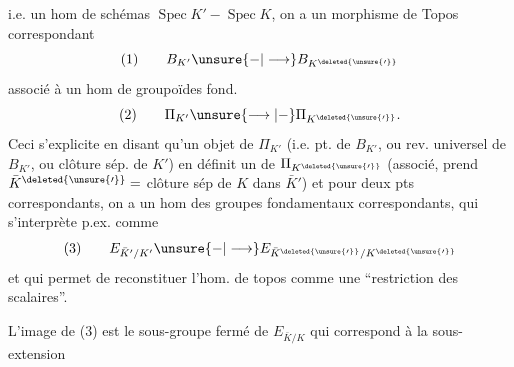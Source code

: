 i.e. un hom de schémas $\operatorname{Spec}K' - \operatorname{Spec}K$, on a un morphisme de Topos correspondant
\[
(1)\qquad B_{K'}\unsure{-|\longrightarrow}B_{K^{\deleted{\unsure{\prime}}}}
\]
associé à un hom de groupoïdes fond.
\[
(2)\qquad \Pi_{K'}\unsure{\longrightarrow|-}\Pi_{K^{\deleted{\unsure{\prime}}}}.
\]
Ceci s'explicite en disant qu'un  objet de $\Pi_{K'}$ (i.e. pt. de $B_{K'}$, ou rev. universel de $B_{K'}$, \deleted{)} ou clôture sép. de $K'$) en définit un de $\Pi_{K^{\deleted{\unsure{\prime}}}}$ (associé,  prend $\bar K^{\deleted{\unsure{\prime}}}=$ clôture  sép de $K$ dans $\bar K'$) et pour deux pts correspondants, on a un hom des groupes fondamentaux correspondants, qui s'interprète p.ex. comme
\[
(3)\qquad E_{\bar K'/K'}\unsure{-|\longrightarrow}E_{\bar K^{\deleted{\unsure{\prime}}}/K^{\deleted{\unsure{\prime}}}}
\]
et qui permet de reconstituer l'hom. de topos comme une ``restriction des scalaires''.

L'image de (3) est le sous-groupe fermé de $E_{\bar K/K}$ qui correspond à la sous-extension
